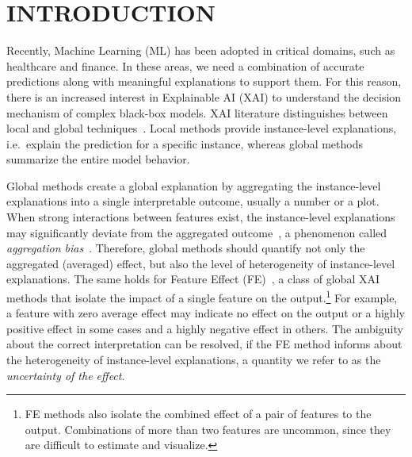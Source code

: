 \documentclass[twoside]{article}
\begin{document}
\section{INTRODUCTION}

Recently, Machine Learning (ML) has been adopted in critical domains,
such as healthcare and finance. In these areas, we need a combination
of accurate predictions along with meaningful explanations to support
them. For this reason, there is an increased interest in Explainable
AI (XAI) to understand the decision mechanism of complex black-box
models. XAI literature distinguishes between local and global
techniques~\citep{Molnar2020interpretable}. Local methods provide
instance-level explanations, i.e.~explain the prediction for a
specific instance, whereas global methods summarize the entire model
behavior.

Global methods create a global explanation by aggregating the
instance-level explanations into a single interpretable outcome,
usually a number or a plot. When strong interactions between features
exist, the instance-level explanations may significantly deviate from
the aggregated outcome~\citep{herbinger2022repid}, a phenomenon called
\emph{aggregation bias}~\citep{mehrabi2021survey}. Therefore, global
methods should quantify not only the aggregated (averaged) effect, but
also the level of heterogeneity of instance-level explanations. The
same holds for Feature Effect (FE)~\citep{Gromping2020MAEP}, a class
of global XAI methods that isolate the impact of a single feature on
the output.\footnote{FE methods also isolate the combined effect of a
  pair of features to the output. Combinations of more than two
  features are uncommon, since they are difficult to estimate and
  visualize.} For example, a feature with zero average effect may
indicate no effect on the output or a highly positive effect in some
cases and a highly negative effect in others. The ambiguity about the
correct interpretation can be resolved, if the FE method informs about
the heterogeneity of instance-level explanations, a quantity we refer
to as the \emph{uncertainty of the effect}.
\end{document}
